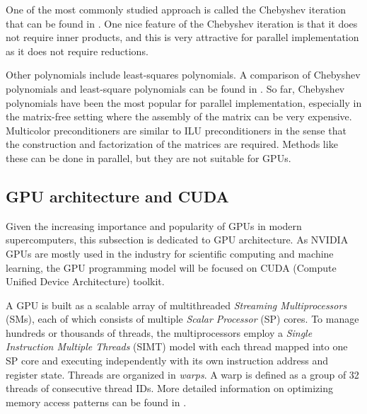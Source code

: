 One of the most commonly studied approach is called the Chebyshev iteration that can be found in \citep{doi:10.1137/1.9780898718003}. One nice feature of the Chebyshev iteration is that it does not require inner products, and this is very attractive for parallel implementation as it does not require reductions.

Other polynomials include least-squares polynomials. A comparison of Chebyshev polynomials and least-square polynomials can be found in \citep{ashby1992comparison}. So far, Chebyshev polynomials have been the most popular for parallel implementation, especially in the matrix-free setting where the assembly of the matrix can be very expensive.
Multicolor preconditioners are similar to ILU preconditioners in the sense that the construction and factorization of the matrices are required. Methods like these can be done in parallel, but they are not suitable for GPUs.

\subsection{GPU architecture and CUDA}
Given the increasing importance and popularity of GPUs in modern supercomputers, this subsection is dedicated to GPU architecture. As NVIDIA GPUs are mostly used in the industry for scientific computing and machine learning, the GPU programming model will be focused on CUDA (Compute Unified Device Architecture) toolkit.

A GPU is built as a scalable array of multithreaded \textit{Streaming Multiprocessors} (SMs), each of which consists of multiple \textit{Scalar Processor} (SP) cores. To manage hundreds or thousands of threads, the multiprocessors employ a \textit{Single Instruction Multiple Threads} (SIMT) model with each thread mapped into one SP core and executing independently with its own instruction address and register state.
Threads are organized in \textit{warps}. A warp is defined as a group of 32 threads of consecutive thread IDs. More detailed information on optimizing memory access patterns can be found in \citep{wilt2013cuda}.

